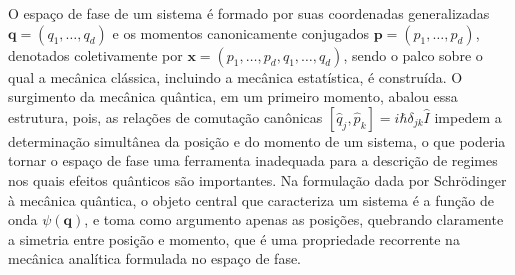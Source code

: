 \documentclass[
	12pt,
	oneside,			%
	a4paper,			%
	english,			%
	brazil				%
	]{abntex2}
\theoremstyle{definition}
\begin{document}
O espaço de fase de um sistema é formado por suas coordenadas generalizadas $\mathbf{q} = (q_1,\ldots,q_d)$ e os momentos canonicamente conjugados $\mathbf{p} = (p_1,\ldots,p_d)$, denotados coletivamente por $\mathbf{x} = \left( p_1,\ldots,p_d,q_1,\ldots,q_d \right)$, sendo o palco sobre o qual a mecânica clássica, incluindo a mecânica estatística, é construída. O surgimento da mecânica quântica, em um primeiro momento, abalou essa estrutura, pois, as relações de comutação canônicas $\left[ \hat{q}_j,\hat{p}_k \right] = i \hbar \delta_{jk} \hat{I}$ impedem a determinação simultânea da posição e do momento de um sistema, o que poderia tornar o espaço de fase uma ferramenta inadequada para a descrição de regimes nos quais efeitos quânticos são importantes. Na formulação dada por Schrödinger à mecânica quântica, o objeto central que caracteriza um sistema é a função de onda $\psi(\mathbf{q})$, e toma como argumento apenas as posições, quebrando claramente a simetria entre posição e momento, que é uma propriedade recorrente na mecânica analítica formulada no espaço de fase.
\end{document}
